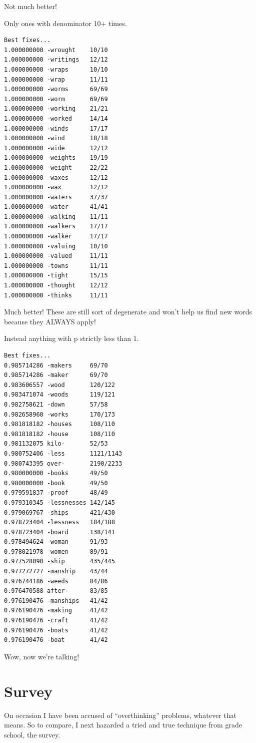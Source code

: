 \documentclass[twocolumn]{article}
\begin{document}
Not much better!

Only ones with denominator 10+ times.
\begin{verbatim}
Best fixes...
1.000000000 -wrought    10/10
1.000000000 -writings   12/12
1.000000000 -wraps      10/10
1.000000000 -wrap       11/11
1.000000000 -worms      69/69
1.000000000 -worm       69/69
1.000000000 -working    21/21
1.000000000 -worked     14/14
1.000000000 -winds      17/17
1.000000000 -wind       18/18
1.000000000 -wide       12/12
1.000000000 -weights    19/19
1.000000000 -weight     22/22
1.000000000 -waxes      12/12
1.000000000 -wax        12/12
1.000000000 -waters     37/37
1.000000000 -water      41/41
1.000000000 -walking    11/11
1.000000000 -walkers    17/17
1.000000000 -walker     17/17
1.000000000 -valuing    10/10
1.000000000 -valued     11/11
1.000000000 -towns      11/11
1.000000000 -tight      15/15
1.000000000 -thought    12/12
1.000000000 -thinks     11/11
\end{verbatim}

Much better! These are still sort of degenerate and won't help
us find new words because they ALWAYS apply!

Instead anything with p strictly less than 1.
\begin{verbatim}
Best fixes...
0.985714286 -makers     69/70
0.985714286 -maker      69/70
0.983606557 -wood       120/122
0.983471074 -woods      119/121
0.982758621 -down       57/58
0.982658960 -works      170/173
0.981818182 -houses     108/110
0.981818182 -house      108/110
0.981132075 kilo-       52/53
0.980752406 -less       1121/1143
0.980743395 over-       2190/2233
0.980000000 -books      49/50
0.980000000 -book       49/50
0.979591837 -proof      48/49
0.979310345 -lessnesses 142/145
0.979069767 -ships      421/430
0.978723404 -lessness   184/188
0.978723404 -board      138/141
0.978494624 -woman      91/93
0.978021978 -women      89/91
0.977528090 -ship       435/445
0.977272727 -manship    43/44
0.976744186 -weeds      84/86
0.976470588 after-      83/85
0.976190476 -manships   41/42
0.976190476 -making     41/42
0.976190476 -craft      41/42
0.976190476 -boats      41/42
0.976190476 -boat       41/42
\end{verbatim}

Wow, now we're talking!

\section{Survey}

On occasion I have been accused of ``overthinking'' problems, whatever
that means. So to compare, I next hazarded a tried and true technique
from grade school, the survey.
\end{document}
